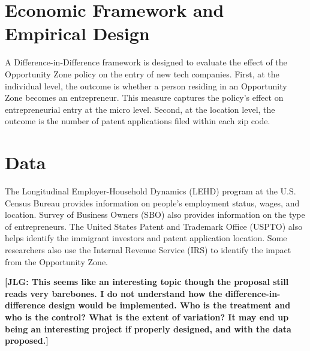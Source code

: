 \section{Economic Framework and Empirical Design}
A Difference-in-Difference framework is designed to evaluate the effect of the Opportunity Zone policy on the entry of new tech companies. First, at the individual level, the outcome is whether a person residing in an Opportunity Zone becomes an entrepreneur. This measure captures the policy’s effect on entrepreneurial entry at the micro level. Second, at the location level, the outcome is the number of patent applications filed within each zip code. 

\section{Data}
The Longitudinal Employer-Household Dynamics (LEHD) program at the U.S. Census Bureau provides information on people's employment status, wages, and location.  Survey of Business Owners (SBO) also provides information on the type of entrepreneurs. The United States Patent and Trademark Office (USPTO) also helps identify the immigrant investors and patent application location. Some researchers also use the Internal Revenue Service (IRS) to identify the impact from the Opportunity Zone.

\bigskip 

\noindent \textbf{[JLG: This seems like an interesting topic though the proposal still reads very barebones. I do not understand how the difference-in-difference design would be implemented. Who is the treatment and who is the control? What is the extent of variation? It may end up being an interesting project if properly designed, and with the data proposed.]}

 




